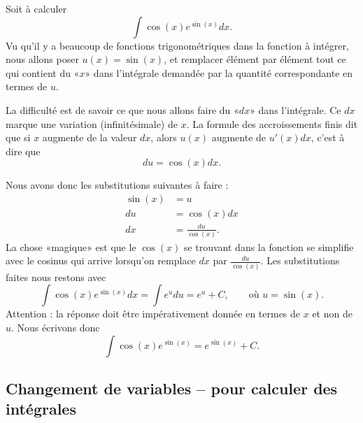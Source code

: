 \begin{example}\label{exempleprimitivechangvar}
    Soit à calculer
    \begin{equation}
        \int \cos(x) e^{\sin(x)}dx.
    \end{equation}
    Vu qu'il y a beaucoup de fonctions trigonométriques dans la fonction à intégrer, nous allons poser \( u(x)=\sin(x)\), et remplacer élément par élément tout ce qui contient du «$x$»  dans l'intégrale demandée par la quantité correspondante en termes de \( u\).

    La difficulté est de savoir ce que nous allons faire du «\( dx\)» dans l'intégrale. Ce \( dx \) marque une variation (infinitésimale) de \( x\). La formule des accroissements finis dit que si \( x\) augmente de la valeur \( dx\), alors \( u(x)\) augmente de $u'(x)dx$, c'est à dire que
    \begin{equation}
        du=\cos(x)dx.
    \end{equation}

    Nous avons donc les substitutions suivantes à faire :
    \begin{subequations}
        \begin{align}
            \sin(x)&=u\\
            du&=\cos(x)dx\\
            dx&=\frac{ du }{ \cos(x) }.
        \end{align}
    \end{subequations}
    La chose «magique» est que le \( \cos(x)\) se trouvant dans la fonction se simplifie avec le cosinus qui arrive lorsqu'on remplace \( dx\) par \( \frac{ du }{ \cos(x) }\). Les substitutions faites nous restons avec
    \begin{equation}
        \int\cos(x) e^{\sin(x)}dx=\int e^{u}du=e^u + C, \qquad \text{où } u= \sin(x).
    \end{equation}
   Attention : la réponse doit \^etre impérativement donnée en termes de \( x\) et non de \( u\). Nous écrivons donc 
    \begin{equation}
        \int \cos(x) e^{\sin(x)}= e^{\sin(x)}+C.
    \end{equation}
\end{example}

\subsection{Changement de variables -- pour calculer des intégrales}

